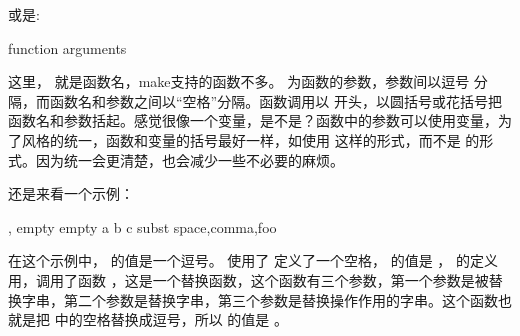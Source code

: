\documentclass[a4paper,10pt]{sphinxmanual}
\begin{document}
\begin{sphinxVerbatim}[commandchars=\\\{\}]
\PYGZlt{}\PYGZgt{} \PYGZlt{}\PYGZgt{}
\end{sphinxVerbatim}

或是:

\begin{sphinxVerbatim}[commandchars=\\\{\}]
\PYGZdl{}\PYGZob{}\PYGZlt{}function\PYGZgt{} \PYGZlt{}arguments\PYGZgt{}\PYGZcb{}
\end{sphinxVerbatim}

这里，  就是函数名，make支持的函数不多。  为函数的参数，参数间以逗号 \sphinxcode{\sphinxupquote{,}} 分隔，而函数名和参数之间以“空格”分隔。函数调用以 \sphinxcode{\sphinxupquote{\$}} 开头，以圆括号或花括号把函数名和参数括起。感觉很像一个变量，是不是？函数中的参数可以使用变量，为了风格的统一，函数和变量的括号最好一样，如使用  这样的形式，而不是
 的形式。因为统一会更清楚，也会减少一些不必要的麻烦。

还是来看一个示例：

\begin{sphinxVerbatim}[commandchars=\\\{\}]
 ,
 empty empty
 a b c
 subst space,comma,foo
\end{sphinxVerbatim}

在这个示例中，  的值是一个逗号。  使用了  定义了一个空格，  的值是  ，  的定义用，调用了函数  ，这是一个替换函数，这个函数有三个参数，第一个参数是被替换字串，第二个参数是替换字串，第三个参数是替换操作作用的字串。这个函数也就是把  中的空格替换成逗号，所以  的值是  。
\end{document}
